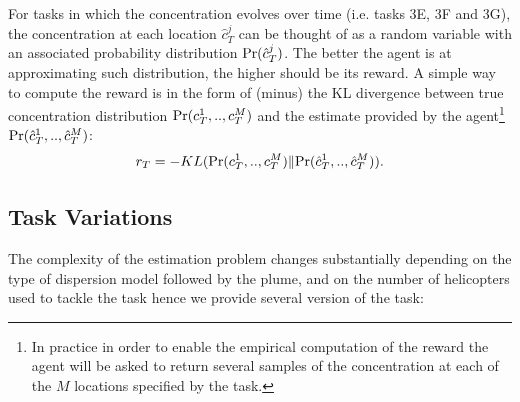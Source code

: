 \documentclass[a4paper,11pt]{report}
\newcommand{\pr}{{\rm Pr}}
\begin{document}
For tasks in which the concentration evolves over time (i.e. tasks 3E, 3F and 3G), the concentration at each location $\hat c^j_T$ can be thought of as a random variable with an associated probability distribution $\pr(\hat c^j_T)$.
The better the agent is at approximating such distribution, the higher should be its reward.
A simple way to compute the reward is in the form of (minus) the KL divergence between true concentration distribution $\pr(c^1_T,..,c^M_T)$ and the estimate provided by the agent\footnote{In practice in order to enable the empirical computation of the reward the agent will be asked to return several samples of the concentration at each of the $M$ locations specified by the task.} $\pr(\hat c^1_T,..,\hat c^M_T)$:
$$
r_T = - KL(\pr(c^1_T,..,c^M_T) \|\pr(\hat c^1_T,..,\hat c^M_T)).
$$


\subsection{Task Variations}  \label{PlumeVariations}
The complexity of the estimation problem changes substantially depending on the type of dispersion model followed by the plume, and on the number of helicopters used to tackle the task hence we provide several version of the task:
\end{document}
